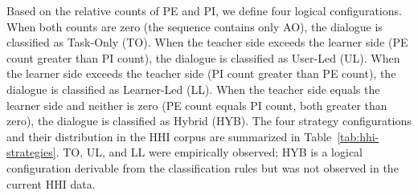 \documentclass[manuscript,review,anonymous]{acmart}
\begin{document}
Based on the relative counts of PE and PI, we define four logical configurations. When both counts are zero (the sequence contains only AO), the dialogue is classified as Task-Only (TO). When the teacher side exceeds the learner side (PE count greater than PI count), the dialogue is classified as User-Led (UL). When the learner side exceeds the teacher side (PI count greater than PE count), the dialogue is classified as Learner-Led (LL). When the teacher side equals the learner side and neither is zero (PE count equals PI count, both greater than zero), the dialogue is classified as Hybrid (HYB). The four strategy configurations and their distribution in the HHI corpus are summarized in Table~\ref{tab:hhi-strategies}. TO, UL, and LL were empirically observed; HYB is a logical configuration derivable from the classification rules but was not observed in the current HHI data.
\end{document}
